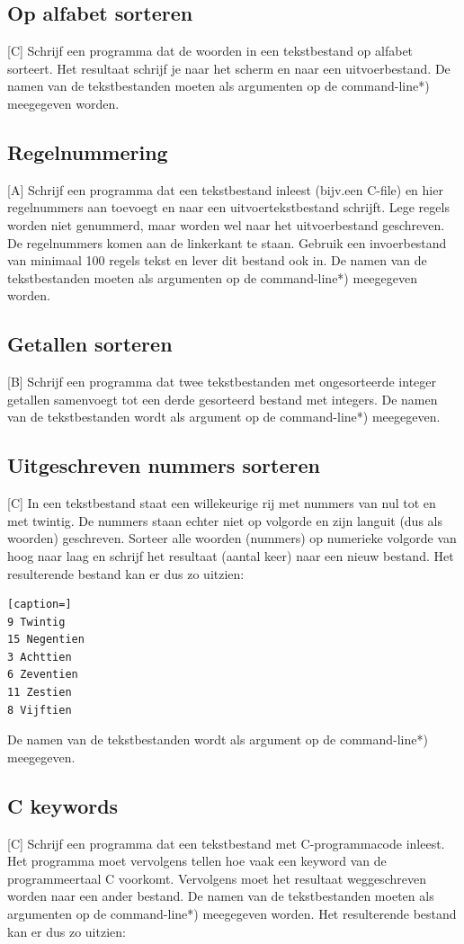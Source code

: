\documentclass[a4paper,10pt,fleqn,twoside]{article}
\begin{document}
\subsection{Op alfabet sorteren}[C]
Schrijf een programma dat de woorden in een tekstbestand op alfabet sorteert. Het resultaat schrijf je naar het scherm en naar een uitvoerbestand. De namen van de tekstbestanden moeten als argumenten op de command-line*) meegegeven worden.

\subsection{Regelnummering}[A]
Schrijf een programma dat een tekstbestand inleest (bijv.\@ een C-file) en hier regelnummers aan toevoegt en naar een uitvoertekstbestand schrijft. Lege regels worden niet genummerd, maar worden wel naar het uitvoerbestand geschreven. De regelnummers komen aan de linkerkant te staan. Gebruik een invoerbestand van minimaal 100 regels tekst en lever dit bestand ook in. De namen van de tekstbestanden moeten als argumenten op de command-line*) meegegeven worden.

\subsection{Getallen sorteren}[B]
Schrijf een programma dat twee tekstbestanden met ongesorteerde integer getallen samenvoegt tot een derde gesorteerd bestand met integers. De namen van de tekstbestanden wordt als argument op de command-line*) meegegeven.

\subsection{Uitgeschreven nummers sorteren}[C]
In een tekstbestand staat een willekeurige rij met nummers van nul tot en met twintig. De nummers staan echter niet op volgorde en zijn languit (dus als woorden) geschreven. Sorteer alle woorden (nummers) op numerieke volgorde van hoog naar laag en schrijf het resultaat (aantal keer) naar een nieuw bestand. Het resulterende bestand kan er dus zo uitzien:

\begin{lstlisting}[caption=]
9 Twintig
15 Negentien
3 Achttien
6 Zeventien
11 Zestien
8 Vijftien
\end{lstlisting}

De namen van de tekstbestanden wordt als argument op de command-line*) meegegeven.

\subsection{C keywords}[C]
Schrijf een programma dat een tekstbestand met C-programmacode inleest. Het programma moet vervolgens tellen hoe vaak een keyword van de programmeertaal C voorkomt. Vervolgens moet het resultaat weggeschreven worden naar een ander bestand. De namen van de tekstbestanden moeten als argumenten op de command-line*) meegegeven worden.  Het resulterende bestand kan er dus zo uitzien:
\end{document}
